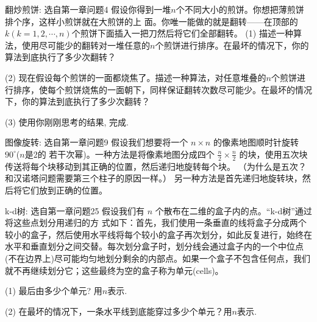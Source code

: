 \begin{exercise}{翻炒煎饼: 选自\cite{algobook}第一章问题4}
假设你得到一堆$n$个不同大小的煎饼。你想把薄煎饼排个序，这样小煎饼就在大煎饼的上
面。你唯一能做的就是翻转——在顶部的$k(k=1,2,\cdots, n)$个煎饼下面插入一把刀然后将它们全部翻转。
(1) 描述一种算法，使用尽可能少的翻转对一堆任意的$n$个煎饼进行排序。在最坏的情况下，你的算法到底执行了多少次翻转？

(2) 现在假设每个煎饼的一面都烧焦了。描述一种算法，对任意堆叠的$n$个煎饼进行排序，使每个煎饼烧焦的一面朝下，同样保证翻转次数尽可能少。在最坏的情况下，你的算法到底执行了多少次翻转？

(3) 使用你刚刚思考的结果, 完成. 
\end{exercise}

\begin{exercise}{图像旋转: 选自\cite{algobook}第一章问题9}
假设我们想要将一个 $n \times n$ 的像素地图顺时针旋转 $90^\circ$($n$是2的
若干次幂)。一种方法是将像素地图分成四个 $\frac{n}{2} \times \frac{n}{2}$ 
的块，使用五次块传送将每个块移动到其正确的位置，然后递归地旋转每个块。
（为什么是五次？和汉诺塔问题需要第三个柱子的原因一样。）
另一种方法是首先递归地旋转块，然后将它们放到正确的位置。


\end{exercise}

\begin{exercise}{k-d树: 选自\cite{algobook}第一章问题25}
    假设我们有 $n$ 个散布在二维的盒子内的点。``k-d树''通过将这些点划分用递归的方
    式如下：首先，我们使用一条垂直的线将盒子分成两个较小的盒子，然后使用水平线将每个较小的盒子再次划分，如此反复进行，始终在水平和垂直划分之间交替。每次划分盒子时，划分线会通过盒子内的一个中位点(不在边界上)尽可能均匀地划分剩余的内部点。如果一个盒子不包含任何点，我们就不再继续划分它；这些最终为空的盒子称为单元(cells)。

    (1) 最后由多少个单元? 用$n$表示.  

    (2) 在最坏的情况下，一条水平线到底能穿过多少个单元？用$n$表示. 
\end{exercise}